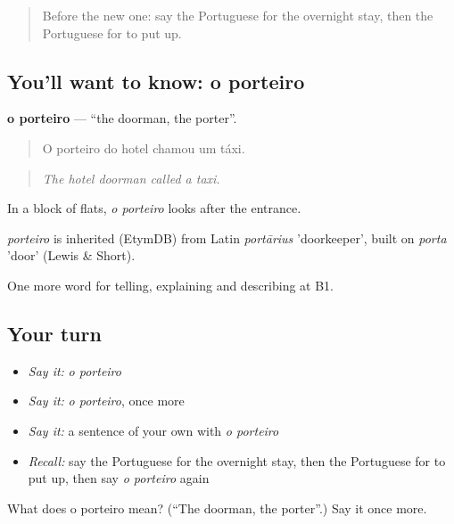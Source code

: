 \label{lesson:PT-C428-porteiro}



\begin{quote}
Before the new one: say the Portuguese for the overnight stay, then the Portuguese for to put up.
\end{quote}

\subsection*{You'll want to know: o porteiro}
\textbf{o porteiro} — \textquotedblleft{}the doorman, the porter\textquotedblright{}.

\begin{quote}
O porteiro do hotel chamou um táxi.
\end{quote}

\begin{quote}
\emph{The hotel doorman called a taxi.}
\end{quote}

In a block of flats, \emph{o porteiro} looks after the entrance.

\begin{cousinweb}
\emph{porteiro} is inherited (EtymDB) from Latin \emph{portārius} 'doorkeeper', built on \emph{porta} 'door' (Lewis \& Short).
\end{cousinweb}

\begin{grammarlens}[title={What you've built}]
One more word for telling, explaining and describing at B1.
\end{grammarlens}

\subsection*{Your turn}
\begin{itemize}
\raggedright
  \item \emph{Say it:} \emph{o porteiro}
  \item \emph{Say it:} \emph{o porteiro}, once more
  \item \emph{Say it:} a sentence of your own with \emph{o porteiro}
  \item \emph{Recall:} say the Portuguese for the overnight stay, then the Portuguese for to put up, then say \emph{o porteiro} again
\end{itemize}

\begin{tcolorbox}[breakable,colback=teal!4,colframe=teal!35!black,title={Before you move on}]
What does o porteiro mean? (\textquotedblleft{}The doorman, the porter\textquotedblright{}.) Say it once more.
\end{tcolorbox}
